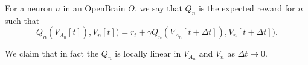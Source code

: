 	\begin{definition}
		For a neuron $n$ in an OpenBrain $O$, we say that $Q_n$ is the expected reward for $n$ such that
		\begin{equation}
			Q_n(V_{A_n}[t]), V_n[t]) = r_t + \gamma Q_n(V_{A_n}[t+\Delta t]), V_n[t + \Delta t]).
		\end{equation}
	\end{definition}
	We claim that in fact the $Q_n$ is locally linear in $V_{A_n}$ and $V_n$ as $\Delta t \to 0.$


